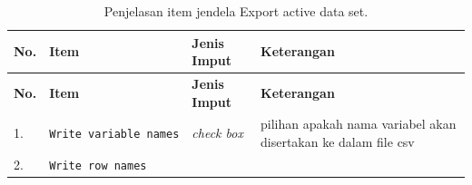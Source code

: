 \documentclass[12pt,]{krantz}
\begin{document}
\begin{longtable}[]{@{}llll@{}}
\caption{\label{tab:exdata} Penjelasan item jendela Export active data set.}\tabularnewline
\toprule
\begin{minipage}[b]{0.05\columnwidth}\raggedright
\textbf{No.}\strut
\end{minipage} & \begin{minipage}[b]{0.23\columnwidth}\raggedright
\textbf{Item}\strut
\end{minipage} & \begin{minipage}[b]{0.10\columnwidth}\raggedright
\textbf{Jenis Imput}\strut
\end{minipage} & \begin{minipage}[b]{0.51\columnwidth}\raggedright
\textbf{Keterangan}\strut
\end{minipage}\tabularnewline
\midrule
\endfirsthead
\toprule
\begin{minipage}[b]{0.05\columnwidth}\raggedright
\textbf{No.}\strut
\end{minipage} & \begin{minipage}[b]{0.23\columnwidth}\raggedright
\textbf{Item}\strut
\end{minipage} & \begin{minipage}[b]{0.10\columnwidth}\raggedright
\textbf{Jenis Imput}\strut
\end{minipage} & \begin{minipage}[b]{0.51\columnwidth}\raggedright
\textbf{Keterangan}\strut
\end{minipage}\tabularnewline
\midrule
\endhead
\begin{minipage}[t]{0.05\columnwidth}\raggedright
1.\strut
\end{minipage} & \begin{minipage}[t]{0.23\columnwidth}\raggedright
\texttt{Write\ variable\ names}\strut
\end{minipage} & \begin{minipage}[t]{0.10\columnwidth}\raggedright
\emph{check box}\strut
\end{minipage} & \begin{minipage}[t]{0.51\columnwidth}\raggedright
pilihan apakah nama variabel akan disertakan ke dalam file csv\strut
\end{minipage}\tabularnewline
\begin{minipage}[t]{0.05\columnwidth}\raggedright
2.\strut
\end{minipage} & \begin{minipage}[t]{0.23\columnwidth}\raggedright
\texttt{Write\ row\ names}\strut

\end{minipage}
\end{longtable}
\end{document}
